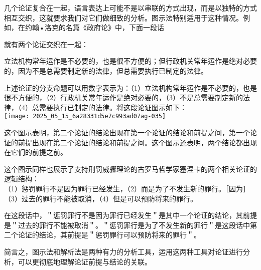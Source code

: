 几个论证复合在一起，语言表达上可能不是以串联的方式出现，而是以独特的方式相互交织，这就要求我们对它们做细致的分析。图示法特别适用于这种情况。例如，在约翰•洛克的名篇《政府论》中，下面一段话

就有两个论证交织在一起：

立法机构常年运作是不必要的，也是很不方便的；但行政机关常年运作是绝对必要的，因为不是总需要制定新的法律，但总需要执行已制定的法律。

上述论证的分支命题可以用数字表示为：（1）立法机构常年运作是不必要的，也是很不方便的，（2）行政机关常年运作是绝对必要的，（3）不是总需要制定新的法律，（4）总需要执行已制定的法律。将这段论证图示如下：\\
\texttt{[image: 2025\_05\_15\_6a28331d5e7c993ad07ag-035]}

这个图示表明，第二个论证的结论出现在第一个论证的结论和前提之间，第一个论证的前提出现在第二个论证的结论和前提之间。这个图示还表明，两个结论都出现在它们的前提之前。

这个图示同样也展示了支持刑罚威骤理论的古罗马哲学家塞涅卡的两个相关论证的逻辑结构：\\
（1）惩罚罪行不是因为罪行已经发生，（2）而是为了不发生新的罪行。［因为］（3）过去的罪行不能被取消，（4）但是可以预防将来的罪行。

在这段话中，＂惩罚罪行不是因为罪行已经发生＂是其中一个论证的结论，其前提是＂过去的罪行不能被取消＂。＂惩罚罪行是为了不发生新的罪行＂是这段话中第二个论证的结论，其前提是＂惩罚罪行可以预防将来的罪行＂。

简言之，图示法和解析法是两种有力的分析工具，运用这两种工具对论证进行分析，可以更彻底地理解论证前提与结论的关联。 